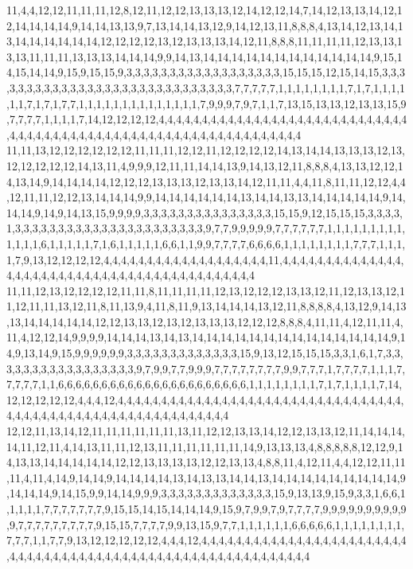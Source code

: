 11,4,4,12,12,11,11,11,12,8,12,11,12,12,13,13,13,12,14,12,12,14,7,14,12,13,13,14,12,12,14,14,14,14,9,14,14,13,13,9,7,13,14,14,13,12,9,14,12,13,11,8,8,8,4,13,14,12,13,14,13,14,14,14,14,14,14,12,12,12,12,13,12,13,13,13,14,12,11,8,8,8,11,11,11,11,12,13,13,13,13,11,11,11,13,13,13,14,14,14,9,9,14,13,14,14,14,14,14,14,14,14,14,14,14,14,9,15,14,15,14,14,9,15,9,15,15,9,3,3,3,3,3,3,3,3,3,3,3,3,3,3,3,3,3,3,15,15,15,12,15,14,15,3,3,3,3,3,3,3,3,3,3,3,3,3,3,3,3,3,3,3,3,3,3,3,3,3,3,3,3,3,7,7,7,7,7,1,1,1,1,1,1,1,1,7,1,7,1,1,1,1,1,1,7,1,7,1,7,7,1,1,1,1,1,1,1,1,1,1,1,1,1,1,7,9,9,9,7,9,7,1,1,7,13,15,13,13,12,13,13,15,9,7,7,7,7,1,1,1,1,7,14,12,12,12,12,4,4,4,4,4,4,4,4,4,4,4,4,4,4,4,4,4,4,4,4,4,4,4,4,4,4,4,4,4,4,4,4,4,4,4,4,4,4,4,4,4,4,4,4,4,4,4,4,4,4,4,4,4,4,4,4,4,4,4,4,4,4,4
11,11,13,12,12,12,12,12,12,11,11,11,12,12,11,12,12,12,12,14,13,14,14,13,13,13,12,13,12,12,12,12,12,14,13,11,4,9,9,9,12,11,11,14,14,13,9,14,13,12,11,8,8,8,4,13,13,12,12,14,13,14,9,14,14,14,14,12,12,12,13,13,13,12,13,13,14,12,11,11,4,4,11,8,11,11,12,12,4,4,12,11,11,12,12,13,14,14,14,9,9,14,14,14,14,14,14,13,14,14,13,13,14,14,14,14,14,9,14,14,14,9,14,9,14,13,15,9,9,9,9,3,3,3,3,3,3,3,3,3,3,3,3,3,3,3,15,15,9,12,15,15,15,3,3,3,3,1,3,3,3,3,3,3,3,3,3,3,3,3,3,3,3,3,3,3,3,3,3,3,9,7,7,9,9,9,9,9,7,7,7,7,7,7,1,1,1,1,1,1,1,1,1,1,1,1,1,6,1,1,1,1,1,7,1,6,1,1,1,1,1,6,6,1,1,9,9,7,7,7,7,6,6,6,6,1,1,1,1,1,1,1,1,7,7,7,1,1,1,1,7,9,13,12,12,12,12,4,4,4,4,4,4,4,4,4,4,4,4,4,4,4,4,4,4,4,11,4,4,4,4,4,4,4,4,4,4,4,4,4,4,4,4,4,4,4,4,4,4,4,4,4,4,4,4,4,4,4,4,4,4,4,4,4,4,4,4,4,4,4
11,11,12,13,12,12,12,12,11,11,8,11,11,11,11,12,13,12,12,12,13,13,12,11,12,13,13,12,11,12,11,11,13,12,11,8,11,13,9,4,11,8,11,9,13,14,14,14,13,12,11,8,8,8,8,4,13,12,9,14,13,13,14,14,14,14,14,12,12,13,13,12,13,12,13,13,13,12,12,12,8,8,8,4,11,11,4,12,11,11,4,11,4,12,12,14,9,9,9,9,14,14,14,13,14,13,14,14,14,14,14,14,14,14,14,14,14,14,14,14,9,14,9,13,14,9,15,9,9,9,9,9,9,3,3,3,3,3,3,3,3,3,3,3,3,3,15,9,13,12,15,15,15,3,3,1,6,1,7,3,3,3,3,3,3,3,3,3,3,3,3,3,3,3,3,3,9,7,9,9,7,7,9,9,9,7,7,7,7,7,7,7,7,9,9,7,7,7,1,7,7,7,7,1,1,1,7,7,7,7,7,1,1,6,6,6,6,6,6,6,6,6,6,6,6,6,6,6,6,6,6,6,6,6,6,1,1,1,1,1,1,1,1,7,1,7,1,1,1,1,7,14,12,12,12,12,12,4,4,4,12,4,4,4,4,4,4,4,4,4,4,4,4,4,4,4,4,4,4,4,4,4,4,4,4,4,4,4,4,4,4,4,4,4,4,4,4,4,4,4,4,4,4,4,4,4,4,4,4,4,4,4,4,4,4,4,4,4,4,4
12,12,11,13,14,12,11,11,11,11,11,11,13,11,12,12,13,13,14,12,12,13,13,12,11,14,14,14,14,11,12,11,4,14,13,11,11,12,13,11,11,11,11,11,11,14,9,13,13,13,4,8,8,8,8,8,12,12,9,14,13,13,14,14,14,14,14,12,12,13,13,13,13,12,12,13,13,4,8,8,11,4,12,11,4,4,12,12,11,11,11,4,11,4,14,9,14,14,9,14,14,14,14,13,14,13,13,14,14,13,14,14,14,14,14,14,14,14,14,9,14,14,14,9,14,15,9,9,14,14,9,9,9,3,3,3,3,3,3,3,3,3,3,3,3,3,15,9,13,13,9,15,9,3,3,1,6,6,1,1,1,1,1,7,7,7,7,7,7,7,9,15,15,14,15,14,14,14,9,15,9,7,9,9,7,9,7,7,7,7,9,9,9,9,9,9,9,9,9,9,9,7,7,7,7,7,7,7,7,7,9,15,15,7,7,7,7,9,9,13,15,9,7,7,1,1,1,1,1,1,6,6,6,6,6,1,1,1,1,1,1,1,1,7,7,7,1,1,7,7,9,13,12,12,12,12,12,4,4,4,12,4,4,4,4,4,4,4,4,4,4,4,4,4,4,4,4,4,4,4,4,4,4,4,4,4,4,4,4,4,4,4,4,4,4,4,4,4,4,4,4,4,4,4,4,4,4,4,4,4,4,4,4,4,4,4,4,4,4,4
